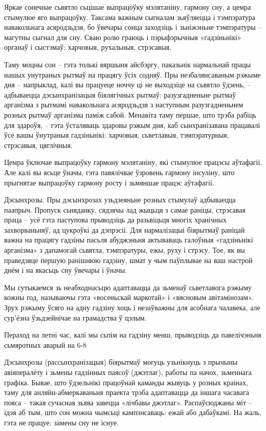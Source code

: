 Яркае сонечнае сьвятло сьцішае выпрацоўку мэлятаніну, гармону сну, а цемра стымулюе яго выпрацоўку. Таксама важным сыгналам зьяўляецца і тэмпэратура навакольнага асяродзьдзя, бо ўвечары сонца заходзіць і зьніжэньне тэмпэратуры – магутны сыгнал для сну. Сваю ролю граюць і пэрыфэрычныя «гадзіньнікі» органаў і сыстэмаў: харчовыя, рухальныя, стрэсавыя.

Таму моцны сон – гэта толькі вяршыня айсбэргу, паказьнік нармальнай працы нашых унутраных рытмаў на працягу ўсіх содняў. Пры незбалянсаваным рэжыме дня – напрыклад, калі вы працуеце ноччу ці не выходзіце на сьвятло ўдзень, – адбываецца дэсынхранізацыя біялягічных рытмаў: разузгадненьне рытмаў арганізма з рытмамі навакольнага асяродзьдзя з наступным разузгадненьнем розных рытмаў арганізма паміж сабой. Менавіта таму першае, што трэба рабіць для здароўя, – гэта ўсталяваць здаровы рэжым дня, каб сынхранізавана працавалі ўсе вашы ўнутраныя гадзіньнікі: харчовыя, сьветлавыя, тэмпэратурныя, стрэсавыя, цяглічныя.

Цемра ўключае выпрацоўку гармону мэлятаніну, які стымулюе працэсы аўтафагіі. Але калі вы ясьце ўначы, гэта павялічвае ўзровень гармону інсуліну, што прыгнятае выпрацоўку гармону росту і зьмяншае працэс аўтафагіі.

Дэсынхрозы. Пры дэсынхрозах узьдзеяньне розных стымулаў адбываецца паапрыч. Пропуск сьняданку, сядзячы лад жыцьця з самае раніцы, стрэсавая праца – усё гэта паступова прыводзіць да разьвіцьця многіх хранічных захворваньняў, ад цукроўкі да дэпрэсіі. Для нармалізацыі біярытмаў раніцай важна на працягу гадзіны пасьля абуджэньня актываваць галоўныя «гадзіньнікі арганізма» з дапамогай сьвятла, тэмпэратуры, ежы, руху і стрэсу. Тое, як вы праведзяце першую ранішнюю гадзіну, шмат у чым паўплывае на ваш настрой днём і на якасьць сну ўвечары і ўначы.

Мы сутыкаемся зь неабходнасьцю адаптавацца да зьменаў сьветлавога рэжыму кожны год, называючы гэта «восеньскай маркотай» і «вясновым авітамінозам». Зрух рэжыму ўсяго на адну гадзіну хоць і незаўважны для асобнага чалавека, але сур'ёзна ўзьдзейнічае на грамадства ў цэлым.

Пераход на летні час, калі мы сьпім на гадзіну менш, прыводзіць да павелічэньня сьмяротных аварый на 6-8%

Дэсынхрозы (рассынхранізацыя) біярытмаў могуць узьнікнуць з прычыны авіяпералёту і зьмены гадзінных паясоў (джэтлаг), работы па начох, зьменнага графіка. Бывае, што ўдзельнікі працоўнай каманды жывуць у розных краінах, таму для анляйн-абмеркаваньня праекта трэба адаптавацца да іншага часавага пояса – такая сучасная зьява завецца «лічбавы джэтлаг». Распаўсюджаны міт – ідэя аб тым, што сон можна чымсьці кампэнсаваць: ежай або дабаўкамі. На жаль, гэта не працуе: замены сну не існуе.

